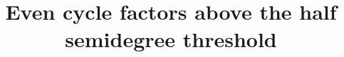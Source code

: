 \documentclass[english]{yupin-notes}
\title{Even cycle factors above the half semidegree threshold}
\author{}
\date{}
\numberwithin{equation}{section}
\begin{document}
\maketitle
\begin{abstract}

\end{abstract}
\tableofcontents












\nocite{HosseiniSopena}


\end{document}
